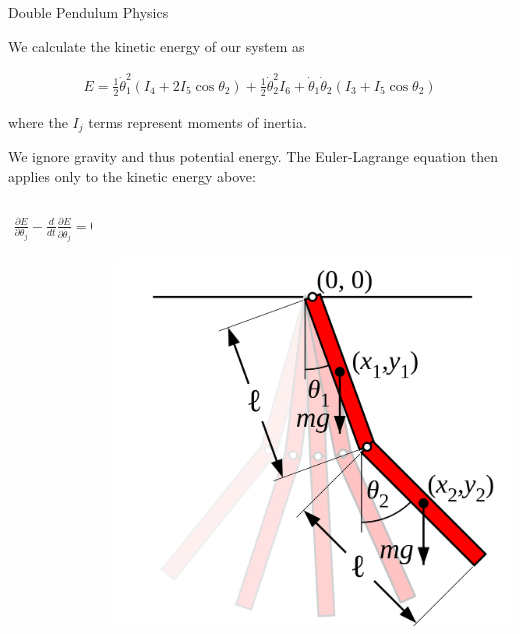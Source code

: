 \documentclass[final]{beamer}
\begin{document}
\begin{frame}{}
{\begin{columns}[t]
\begin{column}{.30\linewidth}
                

\begin{block}{\centering Double Pendulum Physics} 

We calculate the kinetic energy of our system as
	
\begin{align*}
	E = \frac{1}{2}\dot\theta_1^2(I_4 + 2I_5\cos\theta_2)
	+ \frac{1}{2}\dot\theta_2^2I_6
	+ \dot\theta_1\dot\theta_2(I_3 + I_5 \cos\theta_2)
\end{align*}

where the $I_j$ terms represent moments of inertia. 

We ignore gravity and thus potential energy. The Euler-Lagrange equation then applies
only to the kinetic energy above:

\begin{columns}[T]
\begin{column}{16cm}{}
\begin{align*}
\frac{\partial E}{\partial \theta_j} - 
\frac{d}{dt}\frac{\partial E}{\partial \dot{\theta_j}} = 0
\end{align*}
\end{column}
\begin{column}{16cm}{}
\centering\includegraphics[height=12cm, width = 12cm]{figures/double-pendulum.png}\\
\end{column}


\end{columns}
\end{block}
\end{column}
\end{columns}}
\end{frame}
\end{document}
